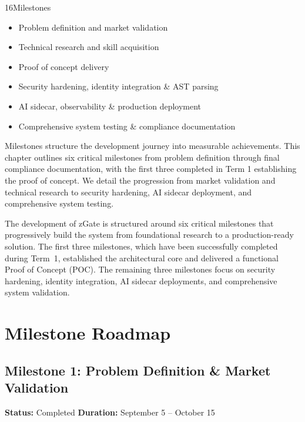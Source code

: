 
\begin{sectionintro}{16}{Milestones}{
  \begin{itemize}[leftmargin=1.5em]
    \item Problem definition and market validation
    \item Technical research and skill acquisition
    \item Proof of concept delivery
    \item Security hardening, identity integration \& AST parsing
    \item AI sidecar, observability \& production deployment
    \item Comprehensive system testing \& compliance documentation
  \end{itemize}
}
Milestones structure the development journey into measurable achievements. This chapter outlines six critical milestones from problem definition through final compliance documentation, with the first three completed in Term 1 establishing the proof of concept. We detail the progression from market validation and technical research to security hardening, AI sidecar deployment, and comprehensive system testing.
\end{sectionintro}

The development of zGate is structured around six critical milestones that progressively build the system from foundational research to a production-ready solution. The first three milestones, which have been successfully completed during Term~1, established the architectural core and delivered a functional Proof of Concept (POC). The remaining three milestones focus on security hardening, identity integration, AI sidecar deployments, and comprehensive system validation.

\section{Milestone Roadmap}

\subsection{Milestone 1: Problem Definition \& Market Validation}
\textbf{Status:} Completed \hfill \textbf{Duration:} September 5 -- October 15

